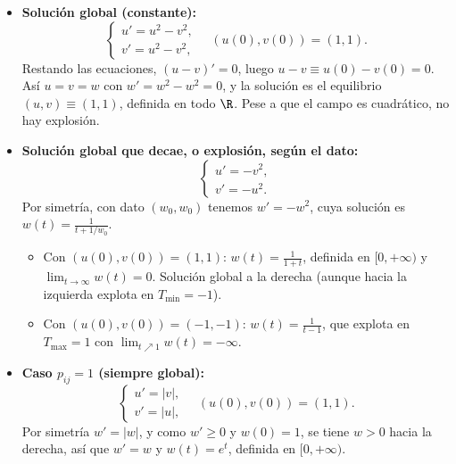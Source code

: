 {\begin{itemize}
        Si en su lugar tomamos $u' = u^2 + v^2$, $v' = u^2 + v^2$ con el mismo dato, se obtiene $w' = 2w^2$, es decir, $w(t) = \frac{1}{1 - 2t}$, que explota antes, en $T_{\max} = \frac{1}{2}$.

        \item \textbf{Solución global (constante):}
        \[
            \begin{cases}
                u' = u^2 - v^2, \\
                v' = u^2 - v^2,
            \end{cases}
            \quad (u(0), v(0)) = (1,1).
        \]
        Restando las ecuaciones, $(u - v)' = 0$, luego $u - v \equiv u(0) - v(0) = 0$. Así $u = v = w$ con $w' = w^2 - w^2 = 0$, y la solución es el equilibrio $(u,v) \equiv (1,1)$, definida en todo $\R$. Pese a que el campo es cuadrático, no hay explosión.

        \item \textbf{Solución global que decae, o explosión, según el dato:}
        \[
            \begin{cases}
                u' = -v^2, \\
                v' = -u^2.
            \end{cases}
        \]
        Por simetría, con dato $(w_0, w_0)$ tenemos $w' = -w^2$, cuya solución es $w(t) = \frac{1}{t + 1/w_0}$.
        \begin{itemize}
            \item Con $(u(0), v(0)) = (1,1)$: $w(t) = \frac{1}{1+t}$, definida en $[0, +\infty)$ y $\lim_{t \to \infty} w(t) = 0$. Solución global a la derecha (aunque hacia la izquierda explota en $T_{\min} = -1$).
            \item Con $(u(0), v(0)) = (-1,-1)$: $w(t) = \frac{1}{t - 1}$, que explota en $T_{\max} = 1$ con $\lim_{t \nearrow 1} w(t) = -\infty$.
        \end{itemize}

        \item \textbf{Caso $p_{ij} = 1$ (siempre global):}
        \[
            \begin{cases}
                u' = |v|, \\
                v' = |u|,
            \end{cases}
            \quad (u(0), v(0)) = (1,1).
        \]
        Por simetría $w' = |w|$, y como $w' \ge 0$ y $w(0) = 1$, se tiene $w > 0$ hacia la derecha, así que $w' = w$ y $w(t) = e^t$, definida en $[0, +\infty)$.
    \end{itemize}
}


